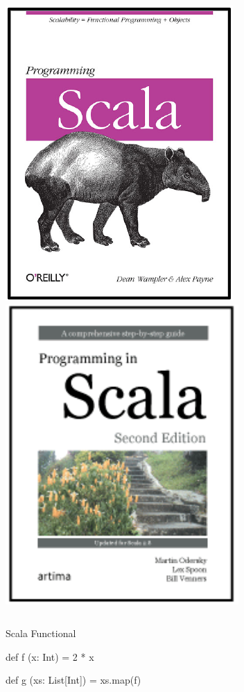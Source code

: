 \documentclass[xcolor=pdflatex,dvipsnames,table]{beamer}
\begin{document}
\begin{frame}[fragile]
\begin{columns}[c]
\begin{center}
\includegraphics[height=0.4\textheight]{figs/programming-scala.pdf} \\
\includegraphics[height=0.4\textheight]{figs/programming-in-scala.pdf}
\end{center}

\end{columns}
\end{frame}

\begin{frame}[fragile]{Scala Functional}

\begin{scala}
def f (x: Int) = 2 * x

def g (xs: List[Int]) =  xs.map(f)
\end{scala}
\end{frame}
\end{document}
